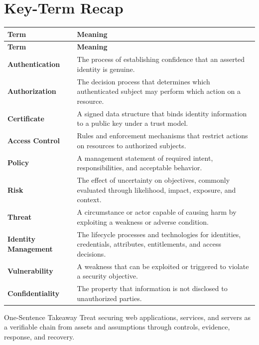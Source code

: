\documentclass[11pt,letterpaper]{article}
\begin{document}
\section*{Key-Term Recap}
\begin{longtable}{>{\raggedright\arraybackslash}p{}>{\raggedright\arraybackslash}p{}}
\toprule\rowcolor{Navy}\color{white}\textbf{Term} & \color{white}\textbf{Meaning}\\\midrule
\endfirsthead
\toprule\rowcolor{Navy}\color{white}\textbf{Term} & \color{white}\textbf{Meaning}\\\midrule
\endhead
\textbf{Authentication} & The process of establishing confidence that an asserted identity is genuine. \\\midrule
\textbf{Authorization} & The decision process that determines which authenticated subject may perform which action on a resource. \\\midrule
\textbf{Certificate} & A signed data structure that binds identity information to a public key under a trust model. \\\midrule
\textbf{Access Control} & Rules and enforcement mechanisms that restrict actions on resources to authorized subjects. \\\midrule
\textbf{Policy} & A management statement of required intent, responsibilities, and acceptable behavior. \\\midrule
\textbf{Risk} & The effect of uncertainty on objectives, commonly evaluated through likelihood, impact, exposure, and context. \\\midrule
\textbf{Threat} & A circumstance or actor capable of causing harm by exploiting a weakness or adverse condition. \\\midrule
\textbf{Identity Management} & The lifecycle processes and technologies for identities, credentials, attributes, entitlements, and access decisions. \\\midrule
\textbf{Vulnerability} & A weakness that can be exploited or triggered to violate a security objective. \\\midrule
\textbf{Confidentiality} & The property that information is not disclosed to unauthorized parties. \\\midrule
\bottomrule
\end{longtable}
\begin{CornellExamBox}{One-Sentence Takeaway}
Treat securing web applications, services, and servers as a verifiable chain from assets and assumptions through controls, evidence, response, and recovery.
\end{CornellExamBox}
\end{document}
